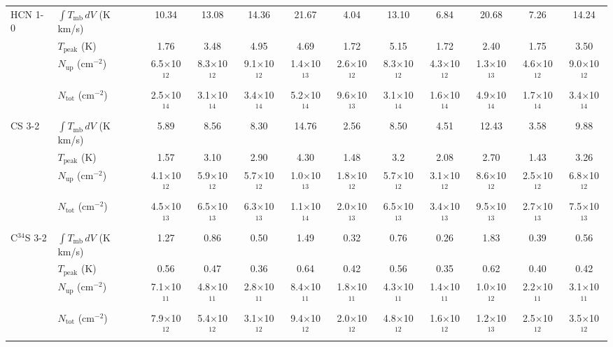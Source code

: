 \documentclass{aa}
\begin{document}
\begin{appendix}
\begin{sidewaystable*}
\begin{tabular}{l l c c c c c c c c c c}
\multirow{4}{*}{HCN 1-0} & $\int{T_{\mathrm{mb}} \, dV}$ (K km/s) & 10.34 & 13.08 & 14.36 & 21.67 & 4.04 & 13.10 & 6.84 & 20.68 & 7.26 & 14.24 \\
& $T_\mathrm{peak}$ (K) & 1.76 & 3.48 & 4.95 & 4.69 & 1.72 & 5.15 & 1.72 & 2.40 & 1.75 & 3.50 \\
& $N_\mathrm{up}$ (cm$^{-2}$) & 6.5$\times$10$^{12}$ & 8.3$\times$10$^{12}$ & 9.1$\times$10$^{12}$ & 1.4$\times$10$^{13}$ & 2.6$\times$10$^{12}$ & 8.3$\times$10$^{12}$ & 4.3$\times$10$^{12}$ & 1.3$\times$10$^{13}$ & 4.6$\times$10$^{12}$ & 9.0$\times$10$^{12}$ \\
& $N_\mathrm{tot}$ (cm$^{-2}$) & 2.5$\times$10$^{14}$ & 3.1$\times$10$^{14}$ & 3.4$\times$10$^{14}$ & 5.2$\times$10$^{14}$ & 9.6$\times$10$^{13}$ & 3.1$\times$10$^{14}$ & 1.6$\times$10$^{14}$ & 4.9$\times$10$^{14}$ & 1.7$\times$10$^{14}$ & 3.4$\times$10$^{14}$\\

\multirow{4}{*}{CS 3-2} & $\int{T_{\mathrm{mb}} \, dV}$ (K km/s) & 5.89 & 8.56 & 8.30 & 14.76 & 2.56 & 8.50 & 4.51 & 12.43 & 3.58 & 9.88 \\
& $T_\mathrm{peak}$ (K) & 1.57 & 3.10 & 2.90 & 4.30 & 1.48 & 3.2 & 2.08 & 2.70 & 1.43 & 3.26 \\
& $N_\mathrm{up}$ (cm$^{-2}$) & 4.1$\times$10$^{12}$ & 5.9$\times$10$^{12}$ & 5.7$\times$10$^{12}$ & 1.0$\times$10$^{13}$ & 1.8$\times$10$^{12}$ & 5.7$\times$10$^{12}$ & 3.1$\times$10$^{12}$ & 8.6$\times$10$^{12}$ & 2.5$\times$10$^{12}$ & 6.8$\times$10$^{12}$ \\
& $N_\mathrm{tot}$ (cm$^{-2}$) & 4.5$\times$10$^{13}$ & 6.5$\times$10$^{13}$ & 6.3$\times$10$^{13}$ & 1.1$\times$10$^{14}$ & 2.0$\times$10$^{13}$ & 6.5$\times$10$^{13}$ & 3.4$\times$10$^{13}$ & 9.5$\times$10$^{13}$ & 2.7$\times$10$^{13}$ & 7.5$\times$10$^{13}$\\

\multirow{4}{*}{C$^{34}$S 3-2} & $\int{T_{\mathrm{mb}} \, dV}$ (K km/s) & 1.27 & 0.86 & 0.50 & 1.49 & 0.32 & 0.76 & 0.26 & 1.83 & 0.39 & 0.56 \\
& $T_\mathrm{peak}$ (K) & 0.56 & 0.47 & 0.36 & 0.64 & 0.42 & 0.56 & 0.35 & 0.62 & 0.40 & 0.42 \\
& $N_\mathrm{up}$ (cm$^{-2}$) & 7.1$\times$10$^{11}$ & 4.8$\times$10$^{11}$ & 2.8$\times$10$^{11}$ & 8.4$\times$10$^{11}$ & 1.8$\times$10$^{11}$ & 4.3$\times$10$^{11}$ & 1.4$\times$10$^{11}$ & 1.0$\times$10$^{12}$ & 2.2$\times$10$^{11}$ & 3.1$\times$10$^{11}$ \\
& $N_\mathrm{tot}$ (cm$^{-2}$) & 7.9$\times$10$^{12}$ & 5.4$\times$10$^{12}$ & 3.1$\times$10$^{12}$ & 9.4$\times$10$^{12}$ & 2.0$\times$10$^{12}$ & 4.8$\times$10$^{12}$ & 1.6$\times$10$^{12}$ & 1.2$\times$10$^{13}$ & 2.5$\times$10$^{12}$ & 3.5$\times$10$^{12}$\\


\end{tabular}
\end{sidewaystable*}
\end{appendix}
\end{document}
